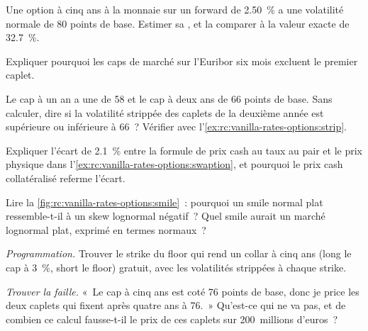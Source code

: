 \begin{exercise}[$\star$]\label{exo:rc:vanilla-rates-options:2}
Une option à cinq ans à la monnaie sur un forward de 2.50~\% a une volatilité normale
de 80 points de base. Estimer sa , et la comparer à la valeur exacte
de 32.7~\%.
\end{exercise}

\begin{exercise}[$\star$]\label{exo:rc:vanilla-rates-options:3}
Expliquer pourquoi les caps de marché sur l'Euribor six mois excluent le premier caplet.
\end{exercise}

\begin{exercise}[$\star\star$]\label{exo:rc:vanilla-rates-options:4}
Le cap à un an a une  de 58 et le cap à deux ans de 66
points de base. Sans calculer, dire si la volatilité strippée des caplets de la deuxième année
est supérieure ou inférieure à 66~? Vérifier avec l'\cref{ex:rc:vanilla-rates-options:strip}.
\end{exercise}

\begin{exercise}[$\star\star$]\label{exo:rc:vanilla-rates-options:5}
Expliquer l'écart de 2.1~\% entre la formule de prix cash au taux au pair et le prix physique
dans l'\cref{ex:rc:vanilla-rates-options:swaption}, et pourquoi le prix cash collatéralisé
referme l'écart.
\end{exercise}

\begin{exercise}[$\star\star$]\label{exo:rc:vanilla-rates-options:6}
Lire la \cref{fig:rc:vanilla-rates-options:smile}~: pourquoi un smile normal plat
ressemble-t-il à un skew lognormal négatif~? Quel smile aurait un marché lognormal
plat, exprimé en termes normaux~?
\end{exercise}

\begin{exercise}[$\star\star\star$]\label{exo:rc:vanilla-rates-options:7}
\emph{Programmation.} Trouver le strike du floor qui rend un collar à cinq ans
(long le cap à 3~\%, short le floor) gratuit, avec les volatilités strippées
à chaque strike.
\end{exercise}

\begin{exercise}[$\star\star\star$]\label{exo:rc:vanilla-rates-options:8}
\emph{Trouver la faille.} «~Le cap à cinq ans est coté 76 points de base, donc je
price les deux caplets qui fixent après quatre ans à 76.~» Qu'est-ce qui ne va
pas, et de combien ce calcul fausse-t-il le prix de ces caplets sur 200~millions d'euros~?
\end{exercise}

